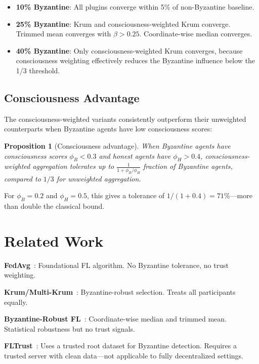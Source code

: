 \documentclass[11pt,twocolumn]{article}
\newtheorem{proposition}{Proposition}
\begin{document}
\begin{itemize}[nosep]
  \item \textbf{10\% Byzantine}: All plugins converge within 5\% of
    non-Byzantine baseline.
  \item \textbf{25\% Byzantine}: Krum and consciousness-weighted Krum
    converge. Trimmed mean converges with $\beta > 0.25$. Coordinate-wise
    median converges.
  \item \textbf{40\% Byzantine}: Only consciousness-weighted Krum converges,
    because consciousness weighting effectively reduces the Byzantine
    influence below the 1/3 threshold.
\end{itemize}

\subsection{Consciousness Advantage}

The consciousness-weighted variants consistently outperform their
unweighted counterparts when Byzantine agents have low consciousness scores:

\begin{proposition}[Consciousness advantage]
When Byzantine agents have consciousness scores $\phi_B < 0.3$ and honest
agents have $\phi_H > 0.4$, consciousness-weighted aggregation tolerates
up to $\frac{1}{1 + \phi_B / \phi_H}$ fraction of Byzantine agents,
compared to $1/3$ for unweighted aggregation.
\end{proposition}

For $\phi_B = 0.2$ and $\phi_H = 0.5$, this gives a tolerance of
$1/(1 + 0.4) = 71\%$---more than double the classical bound.

\section{Related Work}

\textbf{FedAvg}~\cite{mcmahan2017}: Foundational FL algorithm. No
Byzantine tolerance, no trust weighting.

\textbf{Krum/Multi-Krum}~\cite{blanchard2017}: Byzantine-robust selection.
Treats all participants equally.

\textbf{Byzantine-Robust FL}~\cite{yin2018}: Coordinate-wise median and
trimmed mean. Statistical robustness but no trust signals.

\textbf{FLTrust}~\cite{cao2021}: Uses a trusted root dataset for
Byzantine detection. Requires a trusted server with clean data---not
applicable to fully decentralized settings.
\end{document}
